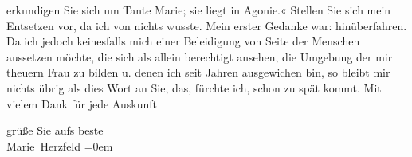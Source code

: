                erkundigen Sie sich um Tante Marie; sie liegt
               in Agonie.« Stellen Sie sich mein Entsetzen vor, da ich von nichts wusste. Mein
               erster Gedanke war: hinüberfahren. Da ich {\pb}jedoch
               keinesfalls mich einer Beleidigung von Seite der Menschen aussetzen möchte, die sich
               als allein berechtigt ansehen, die Umgebung der mir theuern Frau zu bilden u. denen ich seit Jahren
               ausgewichen bin, so bleibt mir nichts übrig als dies Wort an Sie, das, fürchte ich,
               schon zu spät kommt. Mit vielem Dank für jede Auskunft\pend
           
\pstart
           grüße Sie aufs beste {\\[\baselineskip]}\spacefill\mbox{Marie Herzfeld}\pend
           \leftskip=0em{}\endnumbering{}  \newcommand{\dateiname}{L02591}\newcommand{\titel}{Marie Herzfeld an Arthur Schnitzler, 23. 8. 1899}\newcommand{\editorInnen}{Martin Anton Müller und Laura Untner}
